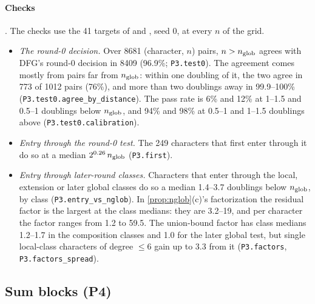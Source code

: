 \paragraph{Checks} . The checks use the 41 targets of  and , seed 0, at every $n$ of the grid.
\begin{itemize}
\item \emph{The round-0 decision.} Over 8681 (character, $n$) pairs, $n>n_{\rm glob}$ agrees with DFG's round-0 decision in 8409 (96.9\%; \texttt{P3.test0}). The agreement comes mostly from pairs far from $n_{\rm glob}$: within one doubling of it, the two agree in 773 of 1012 pairs (76\%), and more than two doublings away in 99.9--100\% (\texttt{P3.test0.agree\_by\_distance}). The pass rate is 6\% and 12\% at 1--1.5 and 0.5--1 doublings below $n_{\rm glob}$, and 94\% and 98\% at 0.5--1 and 1--1.5 doublings above (\texttt{P3.test0.calibration}).
\item \emph{Entry through the round-0 test.} The 249 characters that first enter through it do so at a median $2^{0.26}\,n_{\rm glob}$ (\texttt{P3.first}).
\item \emph{Entry through later-round classes.} Characters that enter through the local, extension or later global classes do so a median 1.4--3.7 doublings below $n_{\rm glob}$, by class (\texttt{P3.entry\_vs\_nglob}). In \cref{prop:nglob}(c)'s factorization the residual factor is the largest at the class medians: they are 3.2--19, and per character the factor ranges from 1.2 to 59.5. The union-bound factor has class medians 1.2--1.7 in the composition classes and 1.0 for the later global test, but single local-class characters of degree $\le6$ gain up to 3.3 from it (\texttt{P3.factors}, \texttt{P3.factors\_spread}).
\end{itemize}

\subsection{Sum blocks (P4)}\label{app:proof-blocks}

